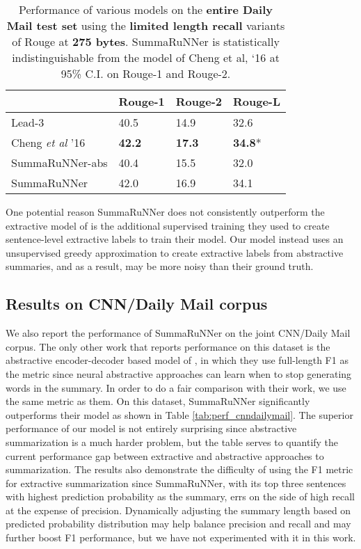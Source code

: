 \documentclass[letterpaper]{article}
\begin{document}
\begin{table}[ht]
\centering
\begin{tabular}{|l|l|l|l|}
\hline
 & Rouge-1 & Rouge-2 & Rouge-L \\
 \hline
Lead-3 & 40.5 & 14.9 & 32.6 \\
Cheng {\it et al} '16 & {\bf 42.2} & {\bf 17.3} & {\bf 34.8}* \\
SummaRuNNer-abs &  40.4  & 15.5  & 32.0 \\
SummaRuNNer &  42.0  & 16.9   & 34.1  \\
\hline
\end{tabular}
\caption{{\small Performance of various models on the {\bf entire Daily Mail test set} using the {\bf limited length recall} variants of Rouge at {\bf 275 bytes}. SummaRuNNer is statistically indistinguishable from the model of  Cheng et al, `16 at 95\% C.I. on Rouge-1 and Rouge-2.}}
\label{tab:test_perf_275b}
\end{table}

One potential reason SummaRuNNer does not consistently outperform the extractive model of \cite{jianpeng} is the additional supervised training they used to create sentence-level extractive labels to train their model. Our model instead uses an unsupervised greedy approximation to create extractive labels from abstractive summaries, and as a result, may be more noisy than their ground truth.

\subsection{Results on CNN/Daily Mail corpus}

We also report the performance of SummaRuNNer on the joint CNN/Daily Mail corpus. The only other work that reports performance on this dataset is the abstractive encoder-decoder based model of \cite{nallapati_conll}, in which they use full-length F1 as the metric since neural abstractive approaches can learn when to stop generating words in the summary. In order to do a fair comparison with their work, we use the same metric as them. On this dataset, SummaRuNNer significantly outperforms their model as shown in Table \ref{tab:perf_cnndailymail}. The superior performance of our model is not entirely surprising since abstractive summarization is a much harder problem, but the table serves to quantify the current performance gap between extractive and abstractive approaches to summarization. The results also demonstrate the difficulty of using the F1 metric for extractive summarization since SummaRuNNer, with its top three sentences with highest prediction probability as the summary, errs on the side of high recall at the expense of precision. Dynamically adjusting the summary length based on predicted probability distribution may help balance precision and recall and may further boost F1 performance, but we have not experimented with it in this work.
\end{document}
